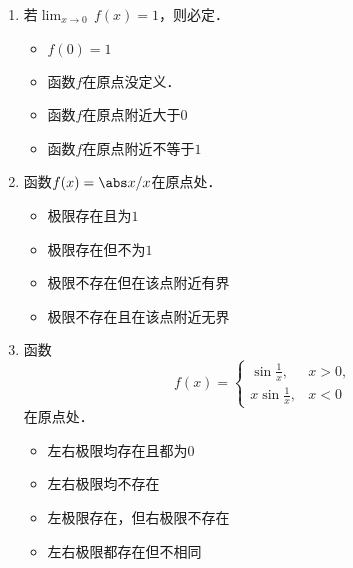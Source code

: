 \documentclass[a4paper,punct=CCT]{ctexbook}
\theoremstyle{definition}
\theoremstyle{remark}
\newif\ifshowsol
\begin{document}
\begin{enumerate}
\item 若\(\lim_{x\to0} \,f(x) = 1\)，则必定\uline{\makebox[6em]{}}．
  \begin{itemize}
    \renewcommand{\labelitemi}{\faCircleThin}
  \item \(f(0) = 1\)
  \item 函数\(f\)在原点没定义．
    \ifshowsol
  \item[\faCircle]
    \else
  \item
    \fi
    函数\(f\)在原点附近大于\(0\)
  \item 函数\(f\)在原点附近不等于\(1\)
  \end{itemize}

\item 函数\(f(x) = \abs x / x\)在原点处\uline{\makebox[6em]{}}．
  \begin{itemize}
    \renewcommand{\labelitemi}{\faCircleThin}
  \item 极限存在且为\(1\)
  \item 极限存在但不为\(1\)
    \ifshowsol
  \item[\faCircle]
    \else
  \item
    \fi
    极限不存在但在该点附近有界
  \item 极限不存在且在该点附近无界
  \end{itemize}

\item 函数
  \begin{equation*}
    f(x) =
    \begin{cases}
      \sin\frac1x, & x > 0, \\
      x \sin\frac1x, & x < 0
    \end{cases}
  \end{equation*}
  在原点处\uline{\makebox[6em]{}}．
  \begin{itemize}
    \renewcommand{\labelitemi}{\faCircleThin}
  \item 左右极限均存在且都为\(0\)
  \item 左右极限均不存在
    \ifshowsol
  \item[\faCircle]
    \else
  \item
    \fi
    左极限存在，但右极限不存在
  \item 左右极限都存在但不相同
  \end{itemize}


\end{enumerate}
\end{document}
